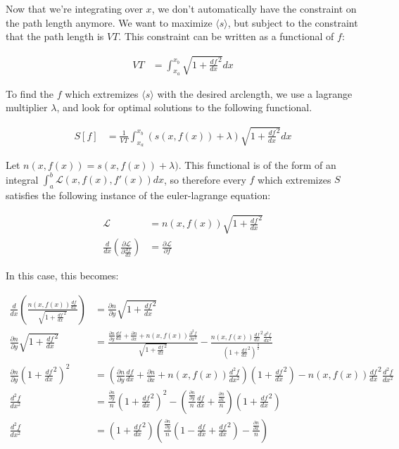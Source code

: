 \documentclass{article}
\begin{document}
Now that we're integrating over $x$, we don't automatically have the constraint
	on the path length anymore.
We want to maximize $\langle s \rangle$, but subject to the constraint that the
	path length is $V T$.
This constraint can be written as a functional of $f$:

\begin{align}
V T & = \int_{x_a}^{x_b} \sqrt{1 + \frac{df}{dx}^2} dx \label{eq:constraint-on-lambda}
\end{align}

To find the $f$ which extremizes $\langle s \rangle$ with the desired arclength,
	we use a lagrange multiplier $\lambda$, and look for optimal solutions
	to the following functional.

\begin{align}
S[f] & = \frac{1}{VT} \int_{x_a}^{x_b} \left( s(x, f(x)) + \lambda \right)
	\sqrt{1 + \frac{df}{dx}^2} dx \label{eq:action}
\end{align}

Let $n(x, f(x)) = s(x, f(x)) + \lambda)$.
This functional is of the form of an integral $\int_a^b \mathcal{L}(x,f(x),f'(x)) dx$,
	so therefore every $f$ which extremizes $S$ satisfies the following
	instance of the euler-lagrange equation:

\begin{align}
\mathcal{L} & = n(x, f(x)) \sqrt{1 + \frac{df}{dx}^2} \\
\frac{d}{dx} \left( \frac{\partial \mathcal{L}}{\partial \frac{df}{dx}} \right)
	& = \frac{\partial \mathcal{L}}{\partial f} \nonumber 
\end{align}

In this case, this becomes:

\begin{align} 
\frac{d}{dx} \left( \frac{n(x, f(x)) \frac{df}{dx}}{\sqrt{1 + \frac{df}{dx}^2}} \right)
	& = \frac{\partial n}{\partial y} \sqrt{1 + \frac{df}{dx}^2} \nonumber\\
\frac{\partial n}{\partial y} \sqrt{1 + \frac{df}{dx}^2} 
& = \frac{\frac{\partial n}{\partial y} \frac{df}{dx} 
		+ \frac{\partial n}{\partial x} 
		+ n(x,f(x)) \frac{\partial^2 f}{\partial x^2}}
	{\sqrt{1 + \frac{df}{dx}^2}}
	- \frac{n(x,f(x)) \frac{df}{dx}^2 \frac{d^2f}{dx^2}}
		{\left( 1 + \frac{df}{dx}^2 \right)^{\frac32}} \nonumber\\
\frac{\partial n}{\partial y} \left(1 + \frac{df}{dx}^2 \right)^2
& = \left( \frac{\partial n}{\partial y} \frac{df}{dx} 
		+ \frac{\partial n}{\partial x} 
		+ n(x,f(x)) \frac{d^2 f}{d x^2} \right)
	\left(1 + \frac{df}{dx}^2\right)
	- n(x,f(x)) \frac{df}{dx}^2 \frac{d^2f}{dx^2} \nonumber\\
\frac{d^2 f}{dx^2}
& = \frac{\frac{\partial n}{\partial y}}{n} \left(1 + \frac{df}{dx}^2 \right)^2
-	\left( \frac{\frac{\partial n}{\partial y}}{n} \frac{df}{dx} 
		+ \frac{\frac{\partial n}{\partial x}}n \right)
	\left(1 + \frac{df}{dx}^2\right) \nonumber\\
\frac{d^2 f}{dx^2}
& = \left( 1 + \frac{df}{dx}^2 \right) \left(
		\frac{\frac{\partial n}{\partial y}}n
		\left( 1 - \frac{df}{dx} + \frac{df}{dx}^2 \right) 
		- \frac{\frac{\partial n}{\partial x}}n
	\right) \nonumber
\end{align}
\end{document}
